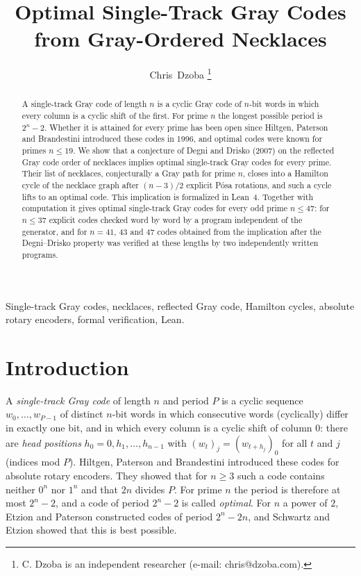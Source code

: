 \documentclass[journal,onecolumn,11pt]{IEEEtran}
\begin{document}
\title{Optimal Single-Track Gray Codes from Gray-Ordered Necklaces}
\author{Chris~Dzoba%
\thanks{C. Dzoba is an independent researcher (e-mail: chris@dzoba.com).}}
\maketitle


\begin{abstract}
A single-track Gray code of length $n$ is a cyclic Gray code of $n$-bit words in which every column is a cyclic shift
of the first. For prime $n$ the longest possible period is $2^n-2$. Whether it is attained for every prime has been open
since Hiltgen, Paterson and Brandestini introduced these codes in 1996, and optimal codes were known for primes
$n\le 19$. We show that a conjecture of Degni and Drisko (2007) on the reflected Gray code order of necklaces implies
optimal single-track Gray codes for every prime. Their list of necklaces, conjecturally a Gray path for prime $n$, closes
into a Hamilton cycle of the necklace graph after $(n-3)/2$ explicit P\'osa rotations, and such a cycle lifts to an
optimal code. This implication is formalized in Lean~4. Together with computation it gives optimal single-track Gray
codes for every odd prime $n\le 47$: for $n\le 37$ explicit codes checked word by word by a program independent of the
generator, and
for $n=41$, $43$ and $47$ codes obtained from the implication after the Degni--Drisko property was verified at these
lengths by two independently written programs.
\end{abstract}

\begin{IEEEkeywords}
Single-track Gray codes, necklaces, reflected Gray code, Hamilton cycles, absolute rotary encoders, formal verification, Lean.
\end{IEEEkeywords}

\section{Introduction}

A \emph{single-track Gray code} of length $n$ and period $P$ is a cyclic sequence $w_0,\dots,w_{P-1}$ of distinct
$n$-bit words in which consecutive words (cyclically) differ in exactly one bit, and in which every column is a cyclic
shift of column $0$: there are \emph{head positions} $h_0=0,h_1,\dots,h_{n-1}$ with $(w_t)_j=(w_{t+h_j})_0$ for all
$t$ and $j$ (indices mod $P$). Hiltgen, Paterson and Brandestini \cite{HPB96} introduced these codes for absolute
rotary encoders. They showed that for $n\ge 3$ such a code contains neither $0^n$ nor $1^n$ and that $2n$ divides $P$.
For prime $n$ the period is therefore at most $2^n-2$, and a code of period $2^n-2$ is called \emph{optimal}. For $n$ a
power of $2$, Etzion and Paterson \cite{EP96} constructed codes of period $2^n-2n$, and Schwartz and Etzion
\cite{SE99} showed that this is best possible.
\end{document}
